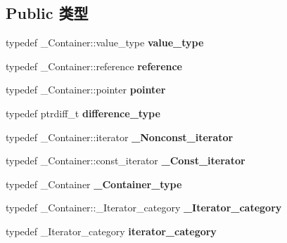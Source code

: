 \subsection*{Public 类型}
\begin{DoxyCompactItemize}
\item 
\mbox{\label{struct___d_b_g__iter__base_a1801a026df73184c639c7852b9744589}} 
typedef \+\_\+\+Container\+::value\+\_\+type {\bfseries value\+\_\+type}
\item 
\mbox{\label{struct___d_b_g__iter__base_a994b0d312c441a1092027f695c3589d7}} 
typedef \+\_\+\+Container\+::reference {\bfseries reference}
\item 
\mbox{\label{struct___d_b_g__iter__base_afe0151d056d16d3bd91d1de4454f1ca4}} 
typedef \+\_\+\+Container\+::pointer {\bfseries pointer}
\item 
\mbox{\label{struct___d_b_g__iter__base_affc34ba8feafdf5faf000f1080bcb516}} 
typedef ptrdiff\+\_\+t {\bfseries difference\+\_\+type}
\item 
\mbox{\label{struct___d_b_g__iter__base_ae957ae26c15354712c15a4d12c89737d}} 
typedef \+\_\+\+Container\+::iterator {\bfseries \+\_\+\+Nonconst\+\_\+iterator}
\item 
\mbox{\label{struct___d_b_g__iter__base_a67c4684b7a99d6cb75ec4bdb54cc3017}} 
typedef \+\_\+\+Container\+::const\+\_\+iterator {\bfseries \+\_\+\+Const\+\_\+iterator}
\item 
\mbox{\label{struct___d_b_g__iter__base_a5c0fc170a96a2ed4f66c71aa3ced88db}} 
typedef \+\_\+\+Container {\bfseries \+\_\+\+Container\+\_\+type}
\item 
\mbox{\label{struct___d_b_g__iter__base_a491d01316c2f69075d2465d62191f74f}} 
typedef \+\_\+\+Container\+::\+\_\+\+Iterator\+\_\+category {\bfseries \+\_\+\+Iterator\+\_\+category}
\item 
\mbox{\label{struct___d_b_g__iter__base_a074d9b1505ffe577b2fb7be49129fb8b}} 
typedef \+\_\+\+Iterator\+\_\+category {\bfseries iterator\+\_\+category}
\end{DoxyCompactItemize}
